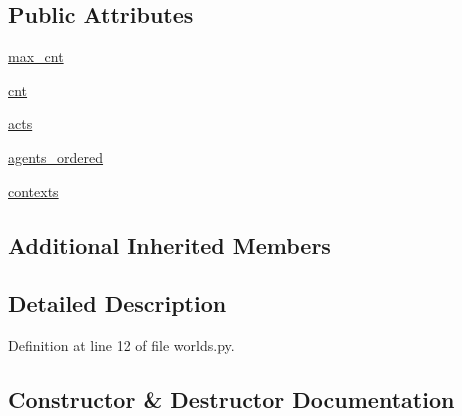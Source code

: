 \subsection*{Public Attributes}
\begin{DoxyCompactItemize}
\item 
\hyperlink{classparlai_1_1tasks_1_1self__chat_1_1worlds_1_1InteractiveWorld_a856612f2880e16bcec744257d7fdf87b}{max\+\_\+cnt}
\item 
\hyperlink{classparlai_1_1tasks_1_1self__chat_1_1worlds_1_1InteractiveWorld_a192bb93be23e21b7e26a25e799c02042}{cnt}
\item 
\hyperlink{classparlai_1_1tasks_1_1self__chat_1_1worlds_1_1InteractiveWorld_a908bd098cba2293d8061d07986b54164}{acts}
\item 
\hyperlink{classparlai_1_1tasks_1_1self__chat_1_1worlds_1_1InteractiveWorld_a6e2bdd8e526ae0c6bd83578284700ff9}{agents\+\_\+ordered}
\item 
\hyperlink{classparlai_1_1tasks_1_1self__chat_1_1worlds_1_1InteractiveWorld_aa59af07b6a16cb4440a6b4096393980a}{contexts}
\end{DoxyCompactItemize}
\subsection*{Additional Inherited Members}


\subsection{Detailed Description}


Definition at line 12 of file worlds.\+py.



\subsection{Constructor \& Destructor Documentation}
\mbox{\label{classparlai_1_1tasks_1_1self__chat_1_1worlds_1_1InteractiveWorld_a05a58b87b6b23a3a5c6ca1aca8ec230f}} 
